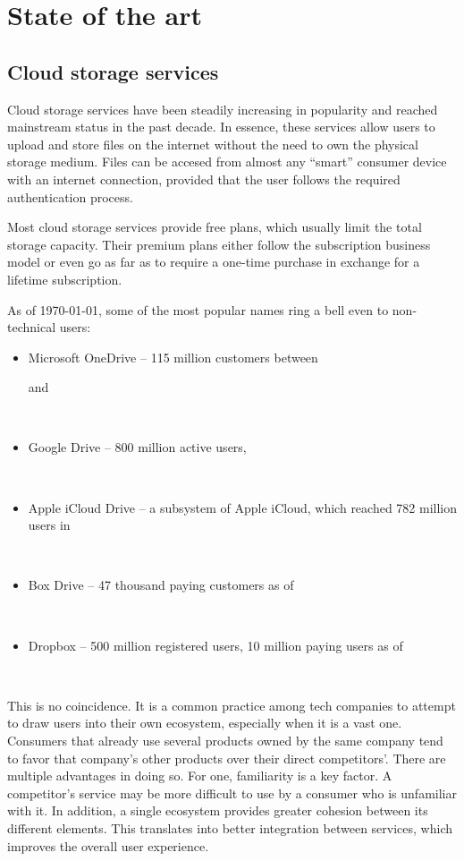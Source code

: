\chapter{State of the art}

\section{Cloud storage services} \label{cloud_storage_services}

Cloud storage services have been steadily increasing in popularity and reached mainstream status in the past decade. In essence, these services allow users to upload and store files on the internet without the need to own the physical storage medium. Files can be accesed from almost any ``smart'' consumer device with an internet connection, provided that the user follows the required authentication process.

Most cloud storage services provide free plans, which usually limit the total storage capacity. Their premium plans either follow the subscription business model or even go as far as to require a one-time purchase in exchange for a lifetime subscription.~\cite{get_3tb_of_lifetime_cloud_storage}

As of \monthyeardate\today, some of the most popular names ring a bell even to non-technical users:
\begin{itemize} \label{lst:cloud_storage_services}
\itemsep0em
\item Microsoft OneDrive -- 115 million customers between \date{2007} and \date{2017}~\cite{10_years_of_onedrive}
\item Google Drive -- 800 million active users, \date{March 2017}~\cite{google_plans_to_leverage,google_updates_drive_focus_on_business}
\item Apple iCloud Drive -- a subsystem of Apple iCloud, which reached 782 million users in \date{February 2016}~\cite{icloud_hits_782m_users}
\item Box Drive -- 47 thousand paying customers as of \date{August 2015}~\cite{box_hires_nasdaq_exec}
\item Dropbox -- 500 million registered users, 10 million paying users as of \date{December 2017}~\cite{dropbox_inc_registration_statement}
\end{itemize}

This is no coincidence. It is a common practice among tech companies to attempt to draw users into their own ecosystem, especially when it is a vast one. Consumers that already use several products owned by the same company tend to favor that company's other products over their direct competitors'. There are multiple advantages in doing so. For one, familiarity is a key factor. A competitor's service may be more difficult to use by a consumer who is unfamiliar with it. In addition, a single ecosystem provides greater cohesion between its different elements. This translates into better integration between services, which improves the overall user experience.

